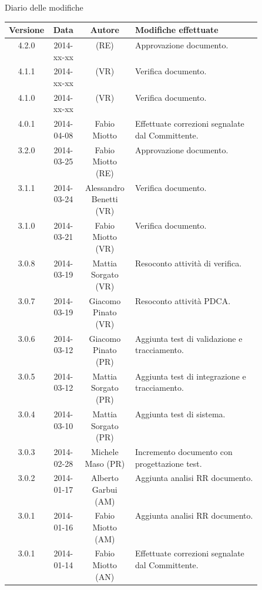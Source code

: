 
\newpage
Diario delle modifiche
\begin{center}
\begin{longtable}{|c|c|c|p{0.5\linewidth}|}
\toprule
\textbf{Versione} & \textbf{Data} & \textbf{Autore} & \textbf{Modifiche effettuate}\\

\midrule
4.2.0 & 2014-xx-xx &  (RE) & Approvazione documento.\\
\midrule
4.1.1 & 2014-xx-xx &  (VR) & Verifica documento.\\
\midrule
4.1.0 & 2014-xx-xx &  (VR) & Verifica documento.\\


\midrule
4.0.1 & 2014-04-08 &  Fabio Miotto & Effettuate correzioni segnalate dal Committente.\\

\midrule
3.2.0 & 2014-03-25 & Fabio Miotto (RE) & Approvazione documento.\\
\midrule
3.1.1 & 2014-03-24 & Alessandro Benetti (VR) & Verifica documento.\\
\midrule
3.1.0 & 2014-03-21 & Fabio Miotto (VR) & Verifica documento.\\
\midrule
3.0.8 & 2014-03-19 & Mattia Sorgato (VR) & Resoconto attività di verifica.\\
\midrule
3.0.7 & 2014-03-19 & Giacomo Pinato (VR) & Resoconto attività PDCA.\\
\midrule
3.0.6 & 2014-03-12 & Giacomo Pinato (PR) & Aggiunta test di validazione e tracciamento.\\
\midrule
3.0.5 & 2014-03-12 & Mattia Sorgato (PR) & Aggiunta test di integrazione e tracciamento.\\
\midrule
3.0.4 & 2014-03-10 & Mattia Sorgato (PR) & Aggiunta test di sistema.\\
\midrule
3.0.3 & 2014-02-28 & Michele Maso (PR) & Incremento documento con progettazione test.\\
\midrule
3.0.2 & 2014-01-17 & Alberto Garbui (AM) & Aggiunta analisi RR documento.\\
\midrule
3.0.1 & 2014-01-16 & Fabio Miotto (AM) & Aggiunta analisi RR documento.\\

\midrule
3.0.1 & 2014-01-14 & Fabio Miotto (AN) & Effettuate correzioni segnalate dal Committente.\\


\end{longtable}
\end{center}

